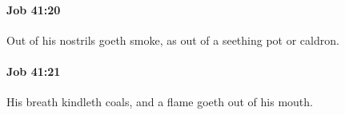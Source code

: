 		\paragraph{Job 41:20} %
			\label{JOB-41-20}

			Out of his nostrils goeth smoke, as out of a seething pot or caldron.


		\paragraph{Job 41:21} %
			\label{JOB-41-21}

			His breath kindleth coals, and a flame goeth out of his mouth.


